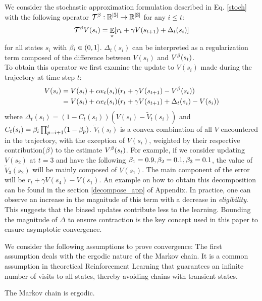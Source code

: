 We consider the stochastic approximation formulation described in Eq. \ref{stoch} with the following operator $\mathcal{T}^{\beta}: \mathbb{R^{|\mathbb{S}|}} \rightarrow \mathbb{R^{|\mathbb{S}|}}$ for any $i \leq t$:
\begin{equation}
    \mathcal{T}^{\beta} V(s_i) = \mathop{\mathbb{E}}_{\pi}[r_t + \gamma V(s_{t+1}) + \Delta_t(s_i)]
\end{equation}
for all states $s_i$ with $\beta_i \in (0,1]$. $\Delta_t(s_i)$ can be interpreted as a regularization term composed of the difference between $V(s_i)$ and $V^{\beta}(s_t)$. \\
To obtain this operator we first examine the update to $V(s_i)$ made during the trajectory at time step $t$:
\begin{equation}
\label{decompose}
\begin{split}
    V(s_i) &= V(s_i) + \alpha e_t(s_i) ( r_t + \gamma V(s_{t+1}) - V^{\beta}(s_t)) \\
    &= V(s_i) + \alpha e_t(s_i) ( r_t + \gamma V(s_{t+1}) + \Delta_t(s_i) - V(s_i))
\end{split}
\end{equation}
where $\Delta_t(s_i) = (1-C_t(s_i))(V(s_i) - \widetilde{V}_t(s_i) )$ and  $C_t(s_i) = \beta_i \prod_{p=i+1}^t (1-\beta_p)$.
$\widetilde{V}_t(s_t)$ is a convex combination of all $V$ encountered in the trajectory, with the exception of $V(s_i)$, weighted by their respective contribution($\beta$) to the estimate $V^{\beta}(s_t)$. For example, if we consider updating $V(s_2)$ at $t=3$ and have the following $\beta_1 = 0.9,\beta_2 = 0.1,\beta_3 = 0.1$, the value of $\widetilde{V}_3(s_2)$ will be mainly composed of $V(s_1)$. The main component of the error will be $r_t + \gamma V(s_4) - V(s_1)$. An example on how to obtain this decomposition can be found in the section \ref{decompose_app} of Appendix. 
In practice, one can observe an increase in the magnitude of this term with a decrease in \emph{eligibility}. This suggests that the biased updates contribute less to the learning. Bounding the magnitude of $\Delta$ to ensure contraction is the key concept used in this paper to ensure asymptotic convergence.

We consider the following assumptions to prove convergence:
The first assumption deals with the ergodic nature of the Markov chain. It is a common assumption in theoretical Reinforcement Learning that guarantees an infinite number of visits to all states, thereby avoiding chains with transient states.
\begin{assumption}
The Markov chain is ergodic.
\end{assumption}


